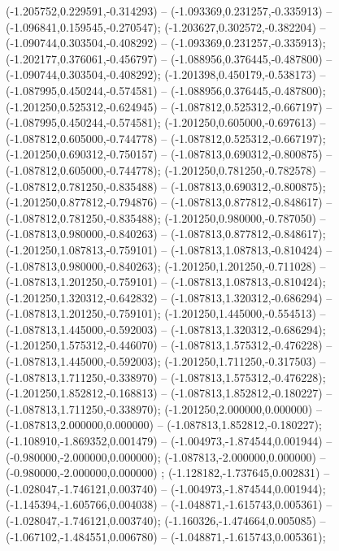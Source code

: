  (-1.205752,0.229591,-0.314293) -- (-1.093369,0.231257,-0.335913) -- (-1.096841,0.159545,-0.270547);
 (-1.203627,0.302572,-0.382204) -- (-1.090744,0.303504,-0.408292) -- (-1.093369,0.231257,-0.335913);
 (-1.202177,0.376061,-0.456797) -- (-1.088956,0.376445,-0.487800) -- (-1.090744,0.303504,-0.408292);
 (-1.201398,0.450179,-0.538173) -- (-1.087995,0.450244,-0.574581) -- (-1.088956,0.376445,-0.487800);
 (-1.201250,0.525312,-0.624945) -- (-1.087812,0.525312,-0.667197) -- (-1.087995,0.450244,-0.574581);
 (-1.201250,0.605000,-0.697613) -- (-1.087812,0.605000,-0.744778) -- (-1.087812,0.525312,-0.667197);
 (-1.201250,0.690312,-0.750157) -- (-1.087813,0.690312,-0.800875) -- (-1.087812,0.605000,-0.744778);
 (-1.201250,0.781250,-0.782578) -- (-1.087812,0.781250,-0.835488) -- (-1.087813,0.690312,-0.800875);
 (-1.201250,0.877812,-0.794876) -- (-1.087813,0.877812,-0.848617) -- (-1.087812,0.781250,-0.835488);
 (-1.201250,0.980000,-0.787050) -- (-1.087813,0.980000,-0.840263) -- (-1.087813,0.877812,-0.848617);
 (-1.201250,1.087813,-0.759101) -- (-1.087813,1.087813,-0.810424) -- (-1.087813,0.980000,-0.840263);
 (-1.201250,1.201250,-0.711028) -- (-1.087813,1.201250,-0.759101) -- (-1.087813,1.087813,-0.810424);
 (-1.201250,1.320312,-0.642832) -- (-1.087813,1.320312,-0.686294) -- (-1.087813,1.201250,-0.759101);
 (-1.201250,1.445000,-0.554513) -- (-1.087813,1.445000,-0.592003) -- (-1.087813,1.320312,-0.686294);
 (-1.201250,1.575312,-0.446070) -- (-1.087813,1.575312,-0.476228) -- (-1.087813,1.445000,-0.592003);
 (-1.201250,1.711250,-0.317503) -- (-1.087813,1.711250,-0.338970) -- (-1.087813,1.575312,-0.476228);
 (-1.201250,1.852812,-0.168813) -- (-1.087813,1.852812,-0.180227) -- (-1.087813,1.711250,-0.338970);
 (-1.201250,2.000000,0.000000) -- (-1.087813,2.000000,0.000000) -- (-1.087813,1.852812,-0.180227);
 (-1.108910,-1.869352,0.001479) -- (-1.004973,-1.874544,0.001944) -- (-0.980000,-2.000000,0.000000);
 (-1.087813,-2.000000,0.000000) -- (-0.980000,-2.000000,0.000000) ;
 (-1.128182,-1.737645,0.002831) -- (-1.028047,-1.746121,0.003740) -- (-1.004973,-1.874544,0.001944);
 (-1.145394,-1.605766,0.004038) -- (-1.048871,-1.615743,0.005361) -- (-1.028047,-1.746121,0.003740);
 (-1.160326,-1.474664,0.005085) -- (-1.067102,-1.484551,0.006780) -- (-1.048871,-1.615743,0.005361);
